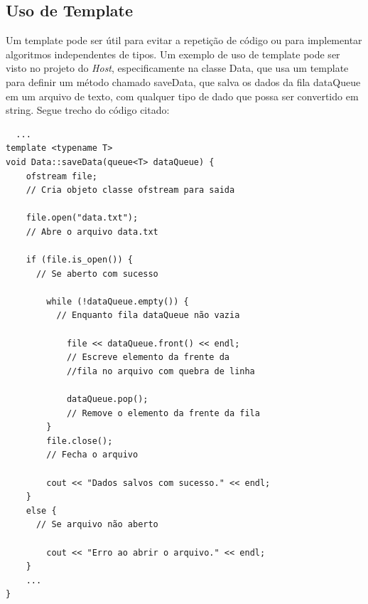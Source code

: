 \documentclass[10pt,twocolumn,letterpaper]{article}
\begin{document}
\subsection{Uso de Template}
Um template pode ser útil para evitar a repetição de código ou para implementar algoritmos independentes de tipos. 
Um exemplo de uso de template pode ser visto no projeto do \emph{Host}, especificamente na classe Data, que usa um template para definir um método chamado saveData, que salva os dados da fila dataQueue em um arquivo de texto, com qualquer tipo de dado que possa ser convertido em string.
Segue trecho do código citado: 
{\scriptsize
\begin{verbatim}
  ...
template <typename T>
void Data::saveData(queue<T> dataQueue) {
    ofstream file; 
    // Cria objeto classe ofstream para saida
    
    file.open("data.txt"); 
    // Abre o arquivo data.txt
    
    if (file.is_open()) { 
      // Se aberto com sucesso

        while (!dataQueue.empty()) { 
          // Enquanto fila dataQueue não vazia

            file << dataQueue.front() << endl; 
            // Escreve elemento da frente da 
            //fila no arquivo com quebra de linha

            dataQueue.pop(); 
            // Remove o elemento da frente da fila
        }
        file.close(); 
        // Fecha o arquivo

        cout << "Dados salvos com sucesso." << endl;
    }
    else { 
      // Se arquivo não aberto

        cout << "Erro ao abrir o arquivo." << endl;
    }
    ...
}

\end{verbatim}
}
\end{document}
